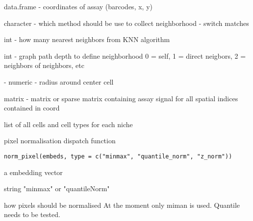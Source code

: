 \documentclass[a4paper]{book}
\begin{document}
\begin{Arguments}
\begin{ldescription}
\item[\code{coord}] data.frame - coordinates of assay (barcodes, x, y)

\item[\code{method}] character - which method should be use to collect 
neighborhood - switch matches

\item[\code{k}] int - how many nearest neighbors from KNN algorithm

\item[\code{depth}] int - graph path depth to define neighborhood 
0 = self, 1 = direct neigbors, 2 = neighbors of neighbors, etc

\item[\code{radius}] - numeric - radius around center cell

\item[\code{signal}] matrix - matrix or sparse matrix containing assay 
signal for all spatial indices contained in coord
\end{ldescription}
\end{Arguments}
%
\begin{Value}
list of all cells and cell types for each niche
\end{Value}
%
\begin{Description}
pixel normalisation dispatch function
\end{Description}
%
\begin{Usage}
\begin{verbatim}
norm_pixel(embeds, type = c("minmax", "quantile_norm", "z_norm"))
\end{verbatim}
\end{Usage}
%
\begin{Arguments}
\begin{ldescription}
\item[\code{embeds}] a embedding vector

\item[\code{type}] string "minmax" or "quantileNorm"
\end{ldescription}
\end{Arguments}
%
\begin{Details}
how pixels should be normalised 
At the moment only miman is used. Quantile needs to be tested.
\end{Details}
\end{document}
